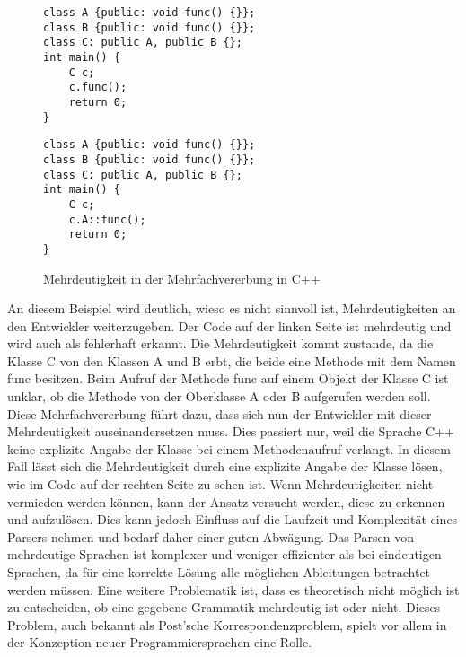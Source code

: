 \documentclass[runningheads]{llncs}
\begin{document}
    \begin{figure}
        \centering
        \begin{minipage}{0.48\textwidth}
            \begin{lstlisting}[style=lstStyle,label={lst:lstlisting1}]
class A {public: void func() {}};
class B {public: void func() {}};
class C: public A, public B {};
int main() {
	C c;
	c.func();
	return 0;
}
            \end{lstlisting}
        \end{minipage}
        \hfill
        \begin{minipage}{0.48\textwidth}
            \begin{lstlisting}[style=lstStyle,label={lst:lstlisting2}]
class A {public: void func() {}};
class B {public: void func() {}};
class C: public A, public B {};
int main() {
	C c;
	c.A::func();
	return 0;
}
            \end{lstlisting}
        \end{minipage}
        \caption{Mehrdeutigkeit in der Mehrfachvererbung in C++}
        \label{fig:figure3}
    \end{figure}

    An diesem Beispiel wird deutlich,
    wieso es nicht sinnvoll ist, Mehrdeutigkeiten an den Entwickler weiterzugeben.
    Der Code auf der linken Seite ist mehrdeutig und wird auch als fehlerhaft erkannt.
    Die Mehrdeutigkeit kommt zustande, da die Klasse C von den Klassen A und B erbt,
    die beide eine Methode mit dem Namen \glqq func\grqq{} besitzen.
    Beim Aufruf der Methode \glqq func\grqq{} auf einem Objekt der Klasse C ist unklar,
    ob die Methode von der Oberklasse A oder B aufgerufen werden soll.
    Diese Mehrfachvererbung führt dazu, dass sich nun der Entwickler mit dieser Mehrdeutigkeit auseinandersetzen muss.
    Dies passiert nur, weil die Sprache C++ keine explizite Angabe der Klasse bei einem Methodenaufruf verlangt.
    In diesem Fall lässt sich die Mehrdeutigkeit durch eine explizite Angabe der Klasse lösen,
    wie im Code auf der rechten Seite zu sehen ist.
    Wenn Mehrdeutigkeiten nicht vermieden werden können,
    kann der Ansatz versucht werden, diese zu erkennen und aufzulösen.
    Dies kann jedoch Einfluss auf die Laufzeit und Komplexität eines Parsers nehmen und bedarf daher einer guten Abwägung\cite{aho2006compilers}.
    Das Parsen von mehrdeutige Sprachen ist komplexer und weniger effizienter als bei eindeutigen Sprachen,
    da für eine korrekte Lösung alle möglichen Ableitungen betrachtet werden müssen\cite{wharton1976resolution}.
    Eine weitere Problematik ist, dass es theoretisch nicht möglich ist zu entscheiden,
    ob eine gegebene Grammatik mehrdeutig ist oder nicht\cite{vasudevan2013detecting}.
    Dieses Problem, auch bekannt als Post'sche Korrespondenzproblem,
    spielt vor allem in der Konzeption neuer Programmiersprachen eine Rolle\cite{hans2014postsche}.
\end{document}
